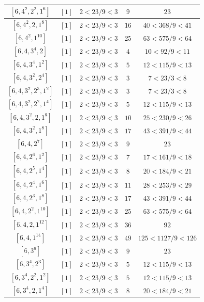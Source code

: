 \documentclass{article}%
\begin{document}
\begin{center}
\begin{longtable}{||c|c|c|c|c||}
$[6, 4^{2}, 2^{2}, 1^{6}]$ & $[1]$ & $2 < 23/9 < 3$ & $9$ & $23$ \\ \hline 
$[6, 4^{2}, 2, 1^{8}]$ & $[1]$ & $2 < 23/9 < 3$ & $16$ & $40 < 368/9 < 41$ \\ \hline 
$[6, 4^{2}, 1^{10}]$ & $[1]$ & $2 < 23/9 < 3$ & $25$ & $63 < 575/9 < 64$ \\ \hline 
$[6, 4, 3^{4}, 2]$ & $[1]$ & $2 < 23/9 < 3$ & $4$ & $10 < 92/9 < 11$ \\ \hline 
$[6, 4, 3^{4}, 1^{2}]$ & $[1]$ & $2 < 23/9 < 3$ & $5$ & $12 < 115/9 < 13$ \\ \hline 
$[6, 4, 3^{2}, 2^{4}]$ & $[1]$ & $2 < 23/9 < 3$ & $3$ & $7 < 23/3 < 8$ \\ \hline 
$[6, 4, 3^{2}, 2^{3}, 1^{2}]$ & $[1]$ & $2 < 23/9 < 3$ & $3$ & $7 < 23/3 < 8$ \\ \hline 
$[6, 4, 3^{2}, 2^{2}, 1^{4}]$ & $[1]$ & $2 < 23/9 < 3$ & $5$ & $12 < 115/9 < 13$ \\ \hline 
$[6, 4, 3^{2}, 2, 1^{6}]$ & $[1]$ & $2 < 23/9 < 3$ & $10$ & $25 < 230/9 < 26$ \\ \hline 
$[6, 4, 3^{2}, 1^{8}]$ & $[1]$ & $2 < 23/9 < 3$ & $17$ & $43 < 391/9 < 44$ \\ \hline 
$[6, 4, 2^{7}]$ & $[1]$ & $2 < 23/9 < 3$ & $9$ & $23$ \\ \hline 
$[6, 4, 2^{6}, 1^{2}]$ & $[1]$ & $2 < 23/9 < 3$ & $7$ & $17 < 161/9 < 18$ \\ \hline 
$[6, 4, 2^{5}, 1^{4}]$ & $[1]$ & $2 < 23/9 < 3$ & $8$ & $20 < 184/9 < 21$ \\ \hline 
$[6, 4, 2^{4}, 1^{6}]$ & $[1]$ & $2 < 23/9 < 3$ & $11$ & $28 < 253/9 < 29$ \\ \hline 
$[6, 4, 2^{3}, 1^{8}]$ & $[1]$ & $2 < 23/9 < 3$ & $17$ & $43 < 391/9 < 44$ \\ \hline 
$[6, 4, 2^{2}, 1^{10}]$ & $[1]$ & $2 < 23/9 < 3$ & $25$ & $63 < 575/9 < 64$ \\ \hline 
$[6, 4, 2, 1^{12}]$ & $[1]$ & $2 < 23/9 < 3$ & $36$ & $92$ \\ \hline 
$[6, 4, 1^{14}]$ & $[1]$ & $2 < 23/9 < 3$ & $49$ & $125 < 1127/9 < 126$ \\ \hline 
$[6, 3^{6}]$ & $[1]$ & $2 < 23/9 < 3$ & $9$ & $23$ \\ \hline 
$[6, 3^{4}, 2^{3}]$ & $[1]$ & $2 < 23/9 < 3$ & $5$ & $12 < 115/9 < 13$ \\ \hline 
$[6, 3^{4}, 2^{2}, 1^{2}]$ & $[1]$ & $2 < 23/9 < 3$ & $5$ & $12 < 115/9 < 13$ \\ \hline 
$[6, 3^{4}, 2, 1^{4}]$ & $[1]$ & $2 < 23/9 < 3$ & $8$ & $20 < 184/9 < 21$ \\ \hline 

\end{longtable}
\end{center}
\end{document}
